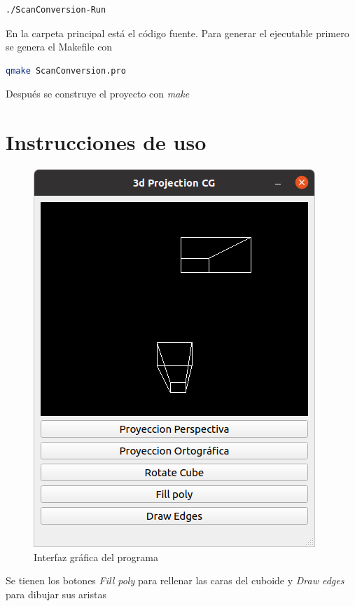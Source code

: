 \documentclass[12pt]{article}
\begin{document}
\begin{lstlisting}[language=bash,title={bash}]
./ScanConversion-Run
\end{lstlisting}


En la carpeta principal está el código fuente. Para generar el ejecutable primero se genera el Makefile con

\begin{lstlisting}[language=bash,title={bash}]
 qmake ScanConversion.pro
\end{lstlisting}

Después se construye el proyecto con \textit{make}



\section{Instrucciones de uso}

\begin{figure}[H]
\centering
\includegraphics[scale=0.5]{images/gui.png}
\caption{Interfaz gráfica del programa}
\end{figure}

Se tienen los botones \textit{Fill poly} para rellenar las caras del cuboide y \textit{Draw edges} para dibujar sus aristas
\end{document}
